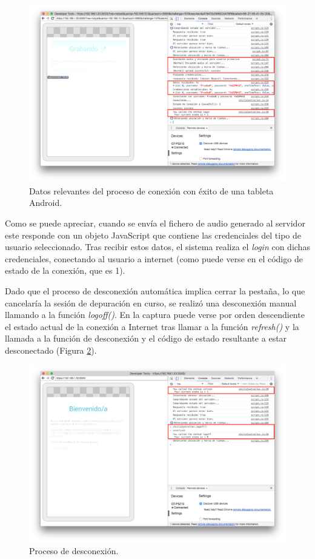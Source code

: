 \begin{figure}[!t]
\begin{center}
\includegraphics[width=0.75\linewidth]{./6_EvalEmpirica/Img/connectionChilli.png}
\end{center}
\caption{Datos relevantes del proceso de conexión con éxito de una tableta Android.}
\label{connectionChilli}
\end{figure}

Como se puede apreciar, cuando se envía el fichero de audio generado al servidor este responde con un objeto JavaScript que contiene las credenciales del tipo de usuario seleccionado. Tras recibir estos datos, el sistema realiza el \emph{login} con dichas credenciales, conectando al usuario a internet (como puede verse en el código de estado de la conexión, que es 1).

Dado que el proceso de desconexión automática implica cerrar la pestaña, lo que cancelaría la sesión de depuración en curso, se realizó una desconexión manual llamando a la función \emph{logoff()}. En la captura puede verse por orden descendiente el estado actual de la conexión a Internet tras llamar a la función \emph{refresh()} y la llamada a la función de desconexión y el código de estado resultante a estar desconectado (Figura \ref{chilliDisconnect}).

\begin{figure}[!t]
\begin{center}
\includegraphics[width=0.75\linewidth]{./6_EvalEmpirica/Img/chilliDisconnect.png}
\end{center}
\caption{Proceso de desconexión.}
\label{chilliDisconnect}
\end{figure}

